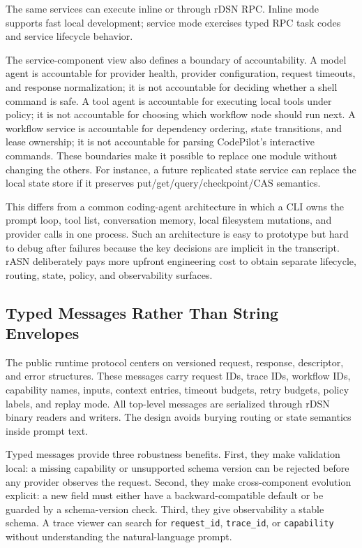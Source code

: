 \documentclass[manuscript,screen,review]{acmart}
\newcommand{\rasn}{rASN\xspace}
\newcommand{\rdsn}{rDSN\xspace}
\begin{document}
The same services can execute inline or through \rdsn RPC. Inline mode supports
fast local development; service mode exercises typed RPC task codes and service
lifecycle behavior.

The service-component view also defines a boundary of accountability. A model
agent is accountable for provider health, provider configuration, request
timeouts, and response normalization; it is not accountable for deciding whether
a shell command is safe. A tool agent is accountable for executing local tools
under policy; it is not accountable for choosing which workflow node should run
next. A workflow service is accountable for dependency ordering, state
transitions, and lease ownership; it is not accountable for parsing CodePilot's
interactive commands. These boundaries make it possible to replace one module
without changing the others. For instance, a future replicated state service can
replace the local state store if it preserves put/get/query/checkpoint/CAS
semantics.

This differs from a common coding-agent architecture in which a CLI owns the
prompt loop, tool list, conversation memory, local filesystem mutations, and
provider calls in one process. Such an architecture is easy to prototype but
hard to debug after failures because the key decisions are implicit in the
transcript. \rasn deliberately pays more upfront engineering cost to obtain
separate lifecycle, routing, state, policy, and observability surfaces.

\subsection{Typed Messages Rather Than String Envelopes}

The public runtime protocol centers on versioned request, response, descriptor,
and error structures. These messages carry request IDs, trace IDs, workflow IDs,
capability names, inputs, context entries, timeout budgets, retry budgets,
policy labels, and replay mode. All top-level messages are serialized through
\rdsn binary readers and writers. The design avoids burying routing or state
semantics inside prompt text.

Typed messages provide three robustness benefits. First, they make validation
local: a missing capability or unsupported schema version can be rejected before
any provider observes the request. Second, they make cross-component evolution
explicit: a new field must either have a backward-compatible default or be
guarded by a schema-version check. Third, they give observability a stable
schema. A trace viewer can search for \texttt{request\_id}, \texttt{trace\_id},
or \texttt{capability} without understanding the natural-language prompt.
\end{document}
